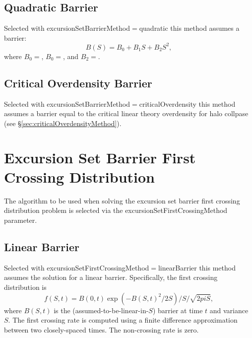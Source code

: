 \subsection{Quadratic Barrier}

Selected with {\normalfont \ttfamily excursionSetBarrierMethod}$=${\normalfont \ttfamily quadratic} this method assumes a barrier:
\begin{equation}
B(S) = B_0 + B_1 S + B_2 S^2,
\end{equation}
where $B_0=${\normalfont \ttfamily [excursionSetBarrierConstantCoefficient]},  $B_0=${\normalfont \ttfamily [excursionSetBarrierLinearCoefficient]}, and $B_2=${\normalfont \ttfamily [excursionSetBarrierQuadraticCoefficient]}.

\subsection{Critical Overdensity Barrier}

Selected with {\normalfont \ttfamily excursionSetBarrierMethod}$=${\normalfont \ttfamily criticalOverdensity} this method assumes a barrier equal to the critical linear theory overdensity for halo collpase (see \S\ref{sec:criticalOverdensityMethod}).

\section{Excursion Set Barrier First Crossing Distribution}

The algorithm to be used when solving the excursion set barrier first crossing distribution problem is selected via the {\normalfont \ttfamily excursionSetFirstCrossingMethod} parameter.

\subsection{Linear Barrier}

Selected with {\normalfont \ttfamily excursionSetFirstCrossingMethod}$=${\normalfont \ttfamily linearBarrier} this method assumes the solution for a linear barrier. Specifically, the first crossing distribution is
\begin{equation}
 f(S,t) = B(0,t) \exp(- B(S,t)^2/2S)/S/\sqrt{2 pi S},
\end{equation}
where $B(S,t)$ is the (assumed-to-be-linear-in-$S$) barrier at time $t$ and variance $S$. The first crossing rate is computed using a finite difference approximation between two closely-spaced times. The non-crossing rate is zero.

